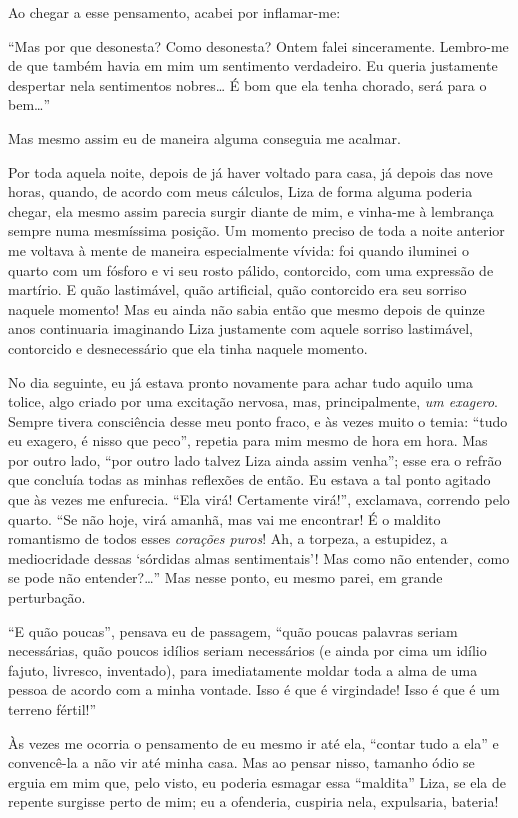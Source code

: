 Ao chegar a esse pensamento, acabei por inflamar-me:

“Mas por que desonesta? Como desonesta? Ontem falei sinceramente.
Lembro-me de que também havia em mim um sentimento verdadeiro. Eu
queria justamente despertar nela sentimentos nobres\ldots{} É bom que ela
tenha chorado, será para o bem\ldots{}”

Mas mesmo assim eu de maneira alguma conseguia me acalmar.

Por toda aquela noite, depois de já haver voltado para casa, já depois
das nove horas, quando, de acordo com meus cálculos, Liza de forma
alguma poderia chegar, ela mesmo assim parecia surgir diante de mim, e
vinha-me à lembrança sempre numa mesmíssima posição. Um momento preciso
de toda a noite anterior me voltava à mente de maneira especialmente
vívida: foi quando iluminei o quarto com um fósforo e vi seu rosto
pálido, contorcido, com uma expressão de martírio. E quão lastimável,
quão artificial, quão contorcido era seu sorriso naquele momento! Mas
eu ainda não sabia então que mesmo depois de quinze anos continuaria
imaginando Liza justamente com aquele sorriso lastimável, contorcido e
desnecessário que ela tinha naquele momento.

No dia seguinte, eu já estava pronto novamente para achar tudo aquilo
uma tolice, algo criado por uma excitação nervosa, mas, principalmente,
\textit{um exagero}. Sempre tivera consciência desse
meu ponto fraco, e às vezes muito o temia: “tudo eu exagero, é nisso
que peco”, repetia para mim mesmo de hora em hora. Mas por outro lado,
“por outro lado talvez Liza ainda assim venha”; esse era o refrão que
concluía todas as minhas reflexões de então. Eu estava a tal ponto
agitado que às vezes me enfurecia. “Ela virá! Certamente virá!”,
exclamava, correndo pelo quarto. “Se não hoje, virá amanhã, mas vai me
encontrar! É o maldito romantismo de todos esses
\textit{corações puros}! Ah, a torpeza, a estupidez,
a mediocridade dessas ‘sórdidas almas sentimentais’! Mas como não
entender, como se pode não entender?\ldots{}” Mas nesse ponto, eu mesmo
parei, em grande perturbação.

“E quão poucas”, pensava eu de passagem, “quão poucas palavras seriam
necessárias, quão poucos idílios seriam necessários (e ainda por cima
um idílio fajuto, livresco, inventado), para imediatamente moldar toda
a alma de uma pessoa de acordo com a minha vontade. Isso é que é
virgindade! Isso é que é um terreno fértil!”

Às vezes me ocorria o pensamento de eu mesmo ir até ela, “contar tudo a
ela” e convencê-la a não vir até minha casa. Mas ao pensar nisso,
tamanho ódio se erguia em mim que, pelo visto, eu poderia esmagar essa
“maldita” Liza, se ela de repente surgisse perto de mim; eu a
ofenderia, cuspiria nela, expulsaria, bateria!

